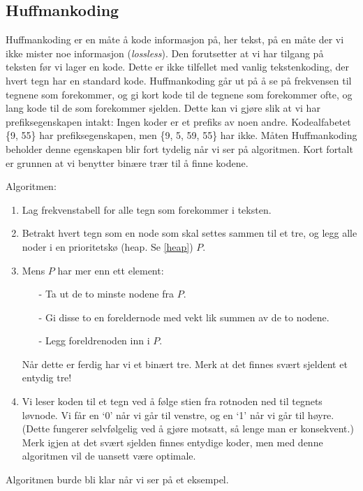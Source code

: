 	\subsection{Huffmankoding}\label{huffman}
		Huffmankoding er en måte å kode informasjon på, her tekst, på en måte der vi ikke mister noe informasjon (\textit{lossless}). Den forutsetter at vi har tilgang på teksten før vi lager en kode. Dette er ikke tilfellet med vanlig tekstenkoding, der hvert tegn har en standard kode. Huffmankoding går ut på å se på frekvensen til tegnene som forekommer, og gi kort kode til de tegnene som forekommer ofte, og lang kode til de som forekommer sjelden. Dette kan vi gjøre slik at vi har prefiksegenskapen intakt: Ingen koder er et prefiks av noen andre. Kodealfabetet \{9, 55\} har prefiksegenskapen, men \{9, 5, 59, 55\} har ikke. Måten Huffmankoding beholder denne egenskapen blir fort tydelig når vi ser på algoritmen. Kort fortalt er grunnen at vi benytter binære trær til å finne kodene.
		
		Algoritmen:
		\begin{enumerate}
			\item Lag frekvenstabell for alle tegn som forekommer i teksten.
			\item Betrakt hvert tegn som en node som skal settes sammen til et tre, og legg alle noder i en prioritetskø (heap. Se \ref{heap}) $P$.
			\item Mens $P$ har mer enn ett element:
				\begin{itemize}
					\item[-] Ta ut de to minste nodene fra $P$.	
					\item[-] Gi disse to en foreldernode med vekt lik summen av de to nodene.	
					\item[-] Legg foreldrenoden inn i $P$.	
				\end{itemize}
				Når dette er ferdig har vi et binært tre. Merk at det finnes svært sjeldent et entydig tre!
			\item Vi leser koden til et tegn ved å følge stien fra rotnoden ned til tegnets løvnode. Vi får en `0' når vi går til venstre, og en `1' når vi går til høyre. (Dette fungerer selvfølgelig ved å gjøre motsatt, så lenge man er konsekvent.) Merk igjen at det svært sjelden finnes entydige koder, men med denne algoritmen vil de uansett være optimale.
		\end{enumerate}
		Algoritmen burde bli klar når vi ser på et eksempel.

